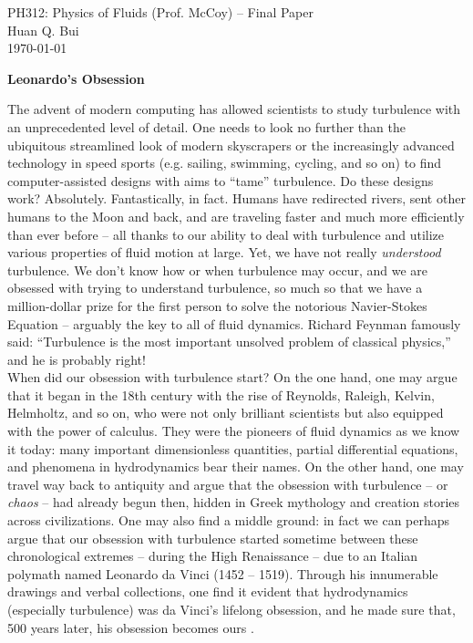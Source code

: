 \documentclass[12pt]{article}
\begin{document}
\begin{framed}
\begin{center}
{\large PH312: Physics of Fluids (Prof. McCoy) -- Final Paper}\\
{ Huan Q. Bui}\\
\today
\end{center}
\end{framed}



\begin{center}
	\Large{\textbf{Leonardo's Obsession}}
\end{center}



The advent of modern computing has allowed scientists to study turbulence with an unprecedented level of detail. One needs to look no further than the ubiquitous streamlined look of modern skyscrapers or the increasingly advanced technology in speed sports (e.g. sailing, swimming, cycling, and so on) to find computer-assisted designs with aims to ``tame'' turbulence. Do these designs work? Absolutely. Fantastically, in fact. Humans have redirected rivers, sent other humans to the Moon and back, and are traveling faster and much more efficiently than ever before -- all thanks to our ability to deal with turbulence and utilize various properties of fluid motion at large. Yet, we have not really \textit{understood} turbulence. We don't know how or when turbulence may occur, and we are obsessed with trying to understand turbulence, so much so that we have a million-dollar prize for the first person to solve the notorious Navier-Stokes Equation -- arguably the key to all of fluid dynamics. Richard Feynman famously said: ``Turbulence is the most important unsolved problem of classical physics,'' and he is probably right!  \\

When did our obsession with turbulence start? On the one hand, one may argue that it began in the 18th century with the rise of Reynolds, Raleigh, Kelvin, Helmholtz, and so on, who were not only brilliant scientists but also equipped with the power of calculus. They were the pioneers of fluid dynamics as we know it today: many important dimensionless quantities, partial differential equations, and phenomena in hydrodynamics bear their names.  On the other hand, one may travel way back to antiquity and argue that the obsession with turbulence -- or \textit{chaos} -- had already begun then, hidden in Greek mythology and creation stories across civilizations. One may also find a middle ground: in fact we can perhaps argue that our obsession with turbulence started sometime between these chronological extremes -- during the High Renaissance -- due to an Italian polymath named Leonardo da Vinci (1452 -- 1519). Through his innumerable drawings and verbal collections, one find it evident that hydrodynamics (especially turbulence) was da Vinci's lifelong obsession, and he made sure that, 500 years later, his obsession becomes ours \cite{lavin1993leonardo}. \\
\end{document}
